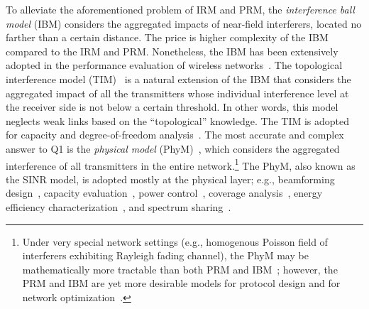 \documentclass[12pt, draftclsnofoot, onecolumn]{IEEEtran}
\begin{document}
To alleviate the aforementioned problem of IRM and PRM, the \emph{interference ball model} (IBM) considers the aggregated impacts of near-field interferers, located no farther than a certain distance. The price is higher complexity of the IBM compared to the IRM and PRM. Nonetheless, the IBM has been extensively adopted in the performance evaluation of wireless networks~\cite{weber2005transmission,weber2007transmission,di2014stochastic,le2010longest}. The topological interference model (TIM)~\cite{jafar2014topological} is a natural extension of the IBM that considers the aggregated impact of all the transmitters whose individual interference level at the receiver side is not below a certain threshold. In other words, this model neglects weak links based on the ``topological'' knowledge. The TIM is adopted for capacity and degree-of-freedom analysis~\cite{jafar2014topological,yi2014topological}. The most accurate and complex answer to Q1 is the \emph{physical model} (PhyM)~\cite{gupta2000capacity}, which considers the aggregated interference of all transmitters in the entire network.\footnote{Under very special network settings (e.g., homogenous Poisson field of interferers exhibiting Rayleigh fading channel), the PhyM may be mathematically more tractable than both PRM and IBM~\cite{Haenggi2013Stochastic}; however, the PRM and IBM are yet more desirable models for protocol design and for network optimization~\cite{le2010longest}.} The PhyM, also known as the SINR model, is adopted mostly at the physical layer; e.g., beamforming design~\cite{schubert2004solution,dahrouj2010coordinated,Moghadam2017PilotJSAC}, capacity evaluation~\cite{gupta2000capacity,sharif2005capacity,baccelli2009stochastic}, power control~\cite{rashid1998joint,chandrasekhar2009power}, coverage analysis~\cite{di2014stochastic}, energy efficiency characterization~\cite{ngo2013energy}, and spectrum sharing~\cite{shokri2016Spectrum}.
\end{document}
